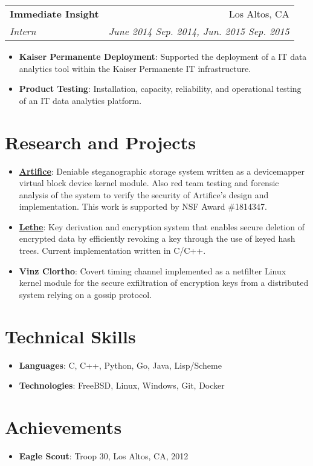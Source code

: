 \documentclass[letterpaper,10pt,oneside]{memoir}
\makeatletter
\newcommand{\resumeItem}[2]{
  \item\small{
    \textbf{#1}{: #2}
  }
}
\newcommand{\resumeSubheading}[4]{
  \vspace{1pt}%
    \begin{tabular*}{0.99\textwidth}[t]{l@{\extracolsep{\fill}}r}
      \textbf{#1} & #2 \\
      \textit{\small #3} & \textit{\small #4} \\
    \end{tabular*}
}
\newcommand{\resumeSubItem}[2]{\resumeItem{#1}{#2}}
\newcommand{\resumeSubHeadingListStart}{\vspace{1pt}\begin{itemize}[noitemsep,nolistsep,leftmargin=*,label={}]}
\newcommand{\resumeSubHeadingListEnd}{\end{itemize}}
\newcommand{\resumeItemListStart}{\begin{itemize}[noitemsep,nolistsep]}
\newcommand{\resumeItemListEnd}{\end{itemize}}
\makeatother
\begin{document}
    \resumeSubheading
      {Immediate Insight}{Los Altos, CA}
      {Intern}{June 2014 \textemdash{} Sep. 2014, Jun. 2015 \textemdash{} Sep. 2015}
      \resumeItemListStart
        \resumeItem{Kaiser Permanente Deployment}
	  {Supported the deployment of a IT data analytics tool within the Kaiser Permanente IT infrastructure.}
        \resumeItem{Product Testing}
          {Installation, capacity, reliability, and operational testing of an IT data analytics platform.}
      \resumeItemListEnd


\section{Research and Projects}
  \resumeSubHeadingListStart
    \resumeSubItem{\href{https://www.ssrc.ucsc.edu/proj/Artifice.html}{Artifice}}
      {Deniable steganographic storage system written as a devicemapper virtual block device kernel module. Also red team testing and forensic 
      analysis of the system to verify the security of Artifice's design and implementation. This work is supported by NSF Award \#1814347.}
    \resumeSubItem{\href{https://www.ssrc.ucsc.edu/proj/securefs.html}{Lethe}}
      {Key derivation and encryption system that enables secure deletion of encrypted data by efficiently revoking a key through the use of keyed hash trees. Current implementation written in C/C++.}
    \resumeSubItem{Vinz Clortho}
      {Covert timing channel implemented as a netfilter Linux kernel module for the secure exfiltration of encryption keys from a distributed system relying on a gossip protocol.}
  \resumeSubHeadingListEnd

%
\section{Technical Skills}
  \resumeSubHeadingListStart
    \resumeSubItem{Languages}
      {C, C++, Python, Go, Java, Lisp/Scheme}
   \resumeSubItem{Technologies}
      {FreeBSD, Linux, Windows, Git, Docker}
  \resumeSubHeadingListEnd

\section{Achievements}
  \resumeSubHeadingListStart
  \resumeSubItem{Eagle Scout}
     {Troop 30, Los Altos, CA, 2012}
  \resumeSubHeadingListEnd



\end{document}

